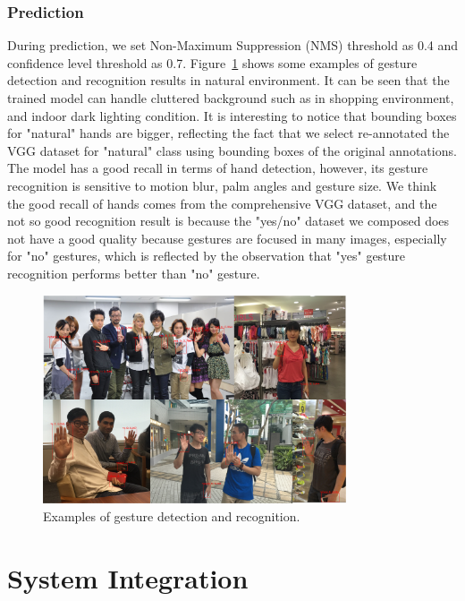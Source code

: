 \subsubsection{Prediction}
During prediction, we set Non-Maximum Suppression (NMS) threshold as 0.4 and confidence level threshold as 0.7. Figure~\ref{fig:ch4-gestpredictemp} shows some examples of gesture detection and recognition results in natural environment. It can be seen that the trained model can handle cluttered background such as in shopping environment, and indoor dark lighting condition. It is interesting to notice that bounding boxes for "natural" hands are bigger, reflecting the fact that we select re-annotated the VGG dataset for "natural" class using bounding boxes of the original annotations. The model has a good recall in terms of hand detection, however, its gesture recognition is sensitive to motion blur, palm angles and gesture size. We think the good recall of hands comes from the comprehensive VGG dataset, and the not so good recognition result is because the "yes/no" dataset we composed does not have a good quality because gestures are focused in many images, especially for "no" gestures, which is reflected by the observation that "yes" gesture recognition performs better than "no" gesture.

\begin{figure}[!htbp]
    \centering
    \includegraphics[width=0.8\textwidth]{figure/ch4-gestpredemp.png}
    \caption{Examples of gesture detection and recognition.}
    \label{fig:ch4-gestpredictemp}
\end{figure}



\section{System Integration}

